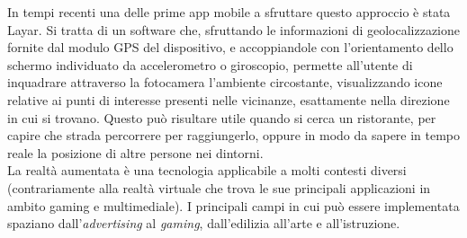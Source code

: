 In tempi recenti una delle prime app mobile a sfruttare questo approccio è stata Layar. Si tratta di un software che, sfruttando le informazioni di geolocalizzazione fornite dal modulo GPS del dispositivo, e accoppiandole con l’orientamento dello schermo individuato da accelerometro o giroscopio, permette all’utente di inquadrare attraverso la fotocamera l’ambiente circostante, visualizzando icone relative ai punti di interesse presenti nelle vicinanze, esattamente nella direzione in cui si trovano. Questo può risultare utile quando si cerca un ristorante, per capire che strada percorrere per raggiungerlo, oppure in modo da sapere in tempo reale la posizione di altre persone nei dintorni.\\
\noindent
La realtà aumentata è una tecnologia applicabile a molti contesti diversi (contrariamente alla realt\`a virtuale che trova le sue principali applicazioni in ambito gaming e multimediale). I principali campi in cui pu\`o essere implementata spaziano dall'\textit{advertising} al \textit{gaming}, dall'edilizia all'arte e all'istruzione.
